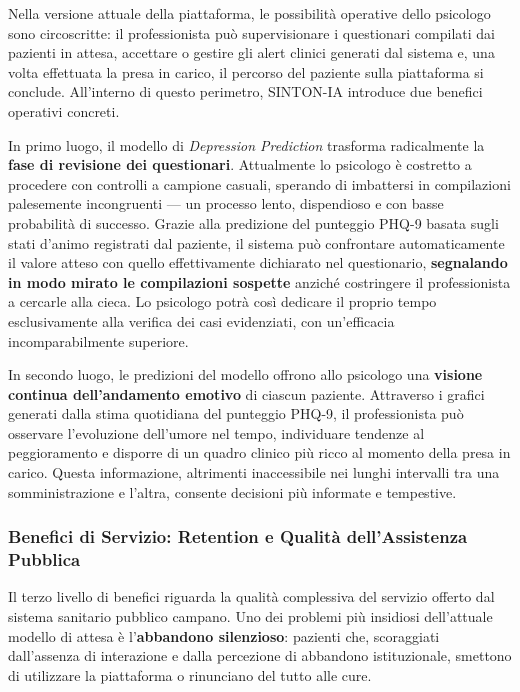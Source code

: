 Nella versione attuale della piattaforma, le possibilità operative dello psicologo sono circoscritte: il professionista può supervisionare i questionari compilati dai pazienti in attesa, accettare o gestire gli alert clinici generati dal sistema e, una volta effettuata la presa in carico, il percorso del paziente sulla piattaforma si conclude. All'interno di questo perimetro, SINTON-IA introduce due benefici operativi concreti.

In primo luogo, il modello di \textit{Depression Prediction} trasforma radicalmente la \textbf{fase di revisione dei questionari}. Attualmente lo psicologo è costretto a procedere con controlli a campione casuali, sperando di imbattersi in compilazioni palesemente incongruenti --- un processo lento, dispendioso e con basse probabilità di successo. Grazie alla predizione del punteggio PHQ-9 basata sugli stati d'animo registrati dal paziente, il sistema può confrontare automaticamente il valore atteso con quello effettivamente dichiarato nel questionario, \textbf{segnalando in modo mirato le compilazioni sospette} anziché costringere il professionista a cercarle alla cieca. Lo psicologo potrà così dedicare il proprio tempo esclusivamente alla verifica dei casi evidenziati, con un'efficacia incomparabilmente superiore.

In secondo luogo, le predizioni del modello offrono allo psicologo una \textbf{visione continua dell'andamento emotivo} di ciascun paziente. Attraverso i grafici generati dalla stima quotidiana del punteggio PHQ-9, il professionista può osservare l'evoluzione dell'umore nel tempo, individuare tendenze al peggioramento e disporre di un quadro clinico più ricco al momento della presa in carico. Questa informazione, altrimenti inaccessibile nei lunghi intervalli tra una somministrazione e l'altra, consente decisioni più informate e tempestive.

\subsubsection{Benefici di Servizio: Retention e Qualità dell'Assistenza Pubblica}
\label{subsubsec:benefici_servizio}

Il terzo livello di benefici riguarda la qualità complessiva del servizio offerto dal sistema sanitario pubblico campano. Uno dei problemi più insidiosi dell'attuale modello di attesa è l'\textbf{abbandono silenzioso}: pazienti che, scoraggiati dall'assenza di interazione e dalla percezione di abbandono istituzionale, smettono di utilizzare la piattaforma o rinunciano del tutto alle cure.

